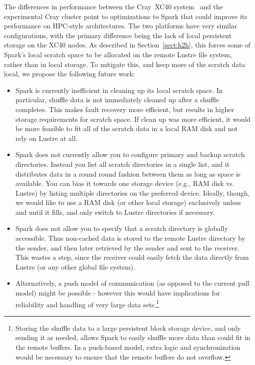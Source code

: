 The differences in performance between the Cray{\textsuperscript{\tiny\textregistered}}~XC40{\textsuperscript{\tiny\texttrademark}} system~\cite{alverson2012cray,craycascadesc12} and the experimental Cray cluster point to optimizations to Spark that could improve its performance on HPC-style architectures.  The two platforms have very similar configurations, with the primary difference being the lack of local persistent storage on the XC40 nodes.  As described in Section~\ref{sect:h2h}, this forces some of Spark's local scratch space to be allocated on the remote Lustre file system, rather than in local storage.  To mitigate this, and keep more of the scratch data local, we propose the following future work:
\begin{itemize}
\item Spark is currently inefficient in cleaning up its local scratch space.  In particular, shuffle data is not immediately cleaned up after a shuffle completes.  This makes fault recovery more efficient, but results in higher storage requirements for scratch space.  If clean up was more efficient, it would be more feasible to fit all of the scratch data in a local RAM disk and not rely on Lustre at all.
\item Spark does not currently allow you to configure primary and backup scratch directories.  Instead you list all scratch directories in a single list, and it distributes data in a round round fashion between them as long as space is available.  You can bias it towards one storage device (e.g., RAM disk vs. Lustre) by listing multiple directories on the preferred device.  Ideally, though, we would like to use a RAM disk (or other local storage) exclusively unless and until it fills, and only switch to Lustre directories if necessary.
\item Spark does not allow you to specify that a scratch directory is globally accessible.  Thus non-cached data is stored to the remote Lustre directory by the sender, and then later retrieved by the sender and sent to the receiver.  This wastes a step, since the receiver could easily fetch the data directly from Lustre (or any other global file system).
\item Alternatively, a push model of communication (as opposed to the current pull model) might be possible - however this would have implications for reliability and handling of very large data sets.\footnote{Storing the shuffle data to a large persistent block storage device, and only sending it as needed, allows Spark to easily shuffle more data than could fit in the remote buffers.  In a push-based model, extra logic and synchronization would be necessary to ensure that the remote buffers do not overflow.}
\end{itemize}
